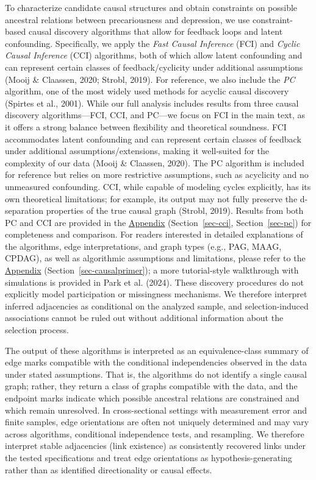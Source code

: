 \documentclass[
]{article}
\begin{document}
To characterize candidate causal structures and obtain constraints on
possible ancestral relations between precariousness and depression, we
use constraint-based causal discovery algorithms that allow for feedback
loops and latent confounding. Specifically, we apply the \emph{Fast
Causal Inference} (FCI) and \emph{Cyclic Causal Inference} (CCI)
algorithms, both of which allow latent confounding and can represent
certain classes of feedback/cyclicity under additional assumptions
(Mooij \& Claassen, 2020; Strobl, 2019). For reference, we also include
the \emph{PC} algorithm, one of the most widely used methods for acyclic
causal discovery (Spirtes et al., 2001). While our full analysis
includes results from three causal discovery algorithms---FCI, CCI, and
PC---we focus on FCI in the main text, as it offers a strong balance
between flexibility and theoretical soundness. FCI accommodates latent
confounding and can represent certain classes of feedback under
additional assumptions/extensions, making it well-suited for the
complexity of our data (Mooij \& Claassen, 2020). The PC algorithm is
included for reference but relies on more restrictive assumptions, such
as acyclicity and no unmeasured confounding. CCI, while capable of
modeling cycles explicitly, has its own theoretical limitations; for
example, its output may not fully preserve the d-separation properties
of the true causal graph (Strobl, 2019). Results from both PC and CCI
are provided in the \hyperref[sec-appendix]{Appendix}
(Section~\ref{sec-cci}, Section~\ref{sec-pc}) for completeness and
comparison. For readers interested in detailed explanations of the
algorithms, edge interpretations, and graph types (e.g., PAG, MAAG,
CPDAG), as well as algorithmic assumptions and limitations, please refer
to the \hyperref[sec-appendix]{Appendix}
(Section~\ref{sec-causalprimer}); a more tutorial-style walkthrough with
simulations is provided in Park et al. (2024). These discovery
procedures do not explicitly model participation or missingness
mechanisms. We therefore interpret inferred adjacencies as conditional
on the analyzed sample, and selection-induced associations cannot be
ruled out without additional information about the selection process.

The output of these algorithms is interpreted as an equivalence-class
summary of edge marks compatible with the conditional independencies
observed in the data under stated assumptions. That is, the algorithms
do not identify a single causal graph; rather, they return a class of
graphs compatible with the data, and the endpoint marks indicate which
possible ancestral relations are constrained and which remain
unresolved. In cross-sectional settings with measurement error and
finite samples, edge orientations are often not uniquely determined and
may vary across algorithms, conditional independence tests, and
resampling. We therefore interpret stable adjacencies (link existence)
as consistently recovered links under the tested specifications and
treat edge orientations as hypothesis-generating rather than as
identified directionality or causal effects.
\end{document}
